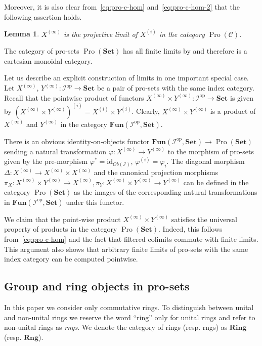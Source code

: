 \documentclass[oneside, 11pt]{amsart}
\numberwithin{equation}{section}
\newtheorem{lemma}{Lemma} \numberwithin{lemma}{section}
\theoremstyle{definition}
\theoremstyle{remark}
\DeclareMathOperator{\Pro}{Pro}
\newcommand{\Set}{\mathbf{Set}}
\newcommand{\Fun}{\mathbf{Fun}}
\newcommand{\op}{\mathrm{op}}
\begin{document}
Moreover, it is also clear from~\eqref{eq:pro-c-hom} and~\eqref{eq:pro-c-hom-2} that the following assertion holds.
\begin{lemma} \label{lem:proobj-is-a-limit}
  \(X^{(\infty)}\) is the projective limit of \(X^{(i)}\) in the category \(\Pro(\mathcal C).\)
\end{lemma}

The category of pro-sets \(\Pro(\Set)\) has all finite limits by \cite[Prop.~6.1.18]{SK06} and therefore is a cartesian monoidal category.

Let us describe an explicit construction of limits in one important special case. Let $X^{(\infty)}$, $Y^{(\infty)}\colon\mathcal{I}^{\op}\to\Set$ be a pair of pro-sets with the same index category. Recall that the pointwise product of functors $X^{(\infty)}\times Y^{(\infty)}\colon\mathcal{I}^{\op}\to\Set$ is given by $(X^{(\infty)} \times Y^{(\infty)})^{(i)} = X^{(i)} \times Y^{(i)}$. Clearly, $X^{(\infty)} \times Y^{(\infty)}$ is a product of $X^{(\infty)}$ and $Y^{(\infty)}$ in the category $\Fun(\mathcal{I}^{\op}, {\Set})$. 

There is an obvious identity-on-objects functor $\Fun(\mathcal{I}^\op, \Set) \to \Pro(\Set)$ sending a natural transformation $\varphi \colon X^{(\infty)} \to Y^{(\infty)}$ to the morphism of pro-sets given by the pre-morphism $\varphi^* = \mathrm{id}_{Ob(\mathcal{I})}$, $\varphi^{(i)} = \varphi_i$. The diagonal morphism $\Delta \colon X^{(\infty)} \to X^{(\infty)} \times X^{(\infty)}$ and the canonical projection morphisms \(\pi_X\colon X^{(\infty)} \times Y^{(\infty)} \to X^{(\infty)}, \pi_Y\colon X^{(\infty)} \times Y^{(\infty)} \to Y^{(\infty)}\) can be defined in the category $\Pro(\Set)$ as the images of the corresponding natural transformations in $\Fun(\mathcal{I}^\op, \Set)$ under this functor.

We claim that the point-wise product $X^{(\infty)} \times Y^{(\infty)}$ satisfies the universal property of products in the category $\Pro(\Set)$. Indeed, this follows from~\eqref{eq:pro-c-hom} and the fact that filtered colimits commute with finite limits. This argument also shows that arbitrary finite limits of pro-sets with the same index category can be computed pointwise.

\subsection{Group and ring objects in pro-sets} \label{sec:group-objects}
In this paper we consider only commutative rings.
To distinguish between unital and non-unital rings we reserve the word ``ring'' only for unital rings and refer to non-unital rings as {\it rngs}.
We denote the category of rings (resp. rngs) as $\textbf{Ring}$ (resp. $\textbf{Rng}$).
\end{document}
